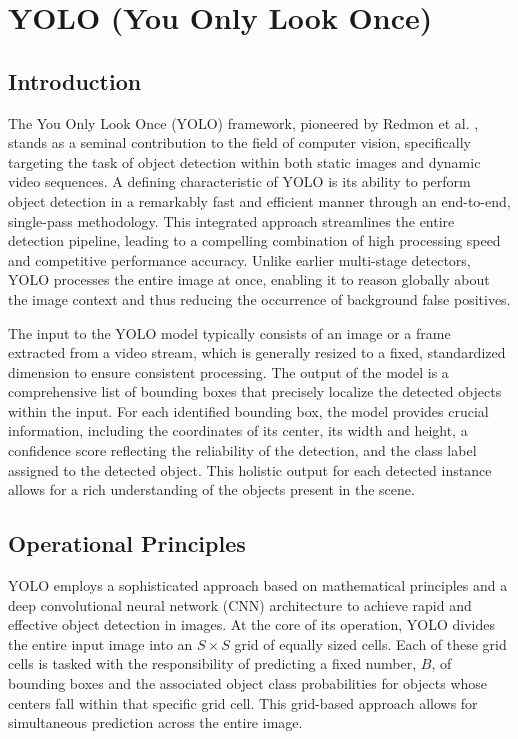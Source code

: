 
\section{YOLO (You Only Look Once)}

\subsection{Introduction}

The You Only Look Once (YOLO) framework, pioneered by Redmon et al. \cite{redmon2016you}, stands as a seminal contribution to the field of computer vision, specifically targeting the task of object detection within both static images and dynamic video sequences. A defining characteristic of YOLO is its ability to perform object detection in a remarkably fast and efficient manner through an end-to-end, single-pass methodology. This integrated approach streamlines the entire detection pipeline, leading to a compelling combination of high processing speed and competitive performance accuracy. Unlike earlier multi-stage detectors, YOLO processes the entire image at once, enabling it to reason globally about the image context and thus reducing the occurrence of background false positives.

The input to the YOLO model typically consists of an image or a frame extracted from a video stream, which is generally resized to a fixed, standardized dimension to ensure consistent processing. The output of the model is a comprehensive list of bounding boxes that precisely localize the detected objects within the input. For each identified bounding box, the model provides crucial information, including the coordinates of its center, its width and height, a confidence score reflecting the reliability of the detection, and the class label assigned to the detected object. This holistic output for each detected instance allows for a rich understanding of the objects present in the scene.

\subsection{Operational Principles}

YOLO employs a sophisticated approach based on mathematical principles and a deep convolutional neural network (CNN) architecture to achieve rapid and effective object detection in images. At the core of its operation, YOLO divides the entire input image into an $S \times S$ grid of equally sized cells. Each of these grid cells is tasked with the responsibility of predicting a fixed number, $B$, of bounding boxes and the associated object class probabilities for objects whose centers fall within that specific grid cell. This grid-based approach allows for simultaneous prediction across the entire image.

